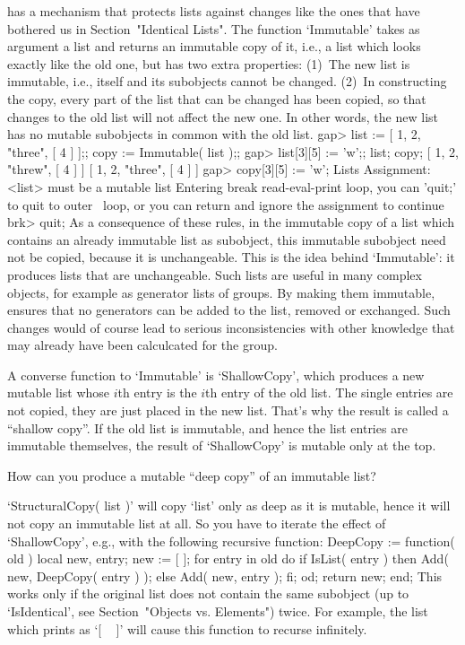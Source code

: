 {\GAP} has a mechanism that protects lists against  changes like the ones
that have bothered   us in    Section~"Identical Lists". The     function
`Immutable' takes as argument a list and returns an immutable copy of it,
i.e., a list  which  looks exactly like the   old one, but has  two extra
properties:
(1)~The new list is immutable, i.e.,  itself and its subobjects cannot be
    changed.
(2)~In constructing the copy, every part of  the list that can be changed
    has been copied, so that changes to the  old list will not affect the
    new one.  In other words, the new  list has no  mutable subobjects in
    common with the old list.
\begintt
    gap> list := [ 1, 2, "three", [ 4 ] ];; copy := Immutable( list );;
    gap> list[3][5] := 'w';; list; copy;
    [ 1, 2, "threw", [ 4 ] ]
    [ 1, 2, "three", [ 4 ] ]
    gap> copy[3][5] := 'w';
    Lists Assignment: <list> must be a mutable list
    Entering break read-eval-print loop, you can 'quit;' to quit to outer \
    loop,
    or you can return and ignore the assignment to continue
    brk> quit;
\endtt
As a consequence of  these rules, in the  immutable copy of a list  which
contains an already immutable list as subobject, this immutable subobject
need not be copied,  because it is unchangeable. This is the idea  behind
`Immutable': it produces lists that are unchangeable. Such lists are
useful in many complex {\GAP} objects,  for example as generator lists of
groups. By  making them immutable, {\GAP}  ensures that no generators can
be added to the list, removed or exchanged. Such  changes would of course
lead  to serious inconsistencies with  other  knowledge that may already
have been calculcated for the group.

A converse function to `Immutable' is `ShallowCopy', which produces a new
mutable list  whose $i$th entry  is the $i$th entry of  the old list. The
single  entries  are not copied,  they are  just placed in  the new list.
That's why the  result is called a ``shallow  copy''. If the  old list is
immutable, and hence  the  list  entries  are immutable themselves,   the
result of `ShallowCopy' is mutable only at the top.

%
\exercise How can  you produce  a  mutable ``deep copy'' of  an immutable
list?

\answer `StructuralCopy( list )' will copy `list' only as deep  as  it is
mutable, hence it will not copy an immutable list at all.  So you have to
iterate the effect  of `ShallowCopy', e.g.,  with the following recursive
function:
\begintt
    DeepCopy := function( old )
    local   new,  entry;
        new := [  ];  for entry  in old  do
        if IsList( entry )  then  Add( new, DeepCopy( entry ) );
                            else  Add( new, entry );  fi;  od;
        return new;
    end;
\endtt
This works only if the original list  does not contain the same subobject
(up to `IsIdentical', see Section~"Objects vs. Elements") twice.
For example, the list which {\GAP} prints as `[ ~ ]' will cause this
function to recurse infinitely.


